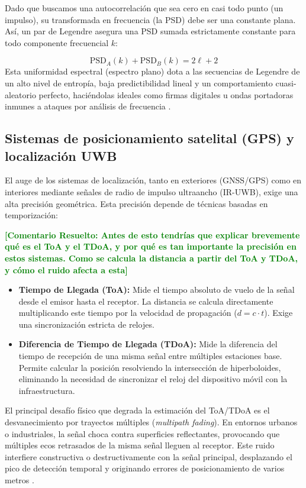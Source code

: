 \documentclass[12pt,a4paper]{tfg_domingo}
\newcommand{\ComentarioR}[1]{\textcolor{green}{\textbf{[Comentario Resuelto:
#1]}}}
\begin{document}
Dado que buscamos una autocorrelación que sea cero en casi todo punto (un impulso), su transformada en frecuencia (la PSD) debe ser una constante plana. Así, un par de Legendre asegura una PSD sumada estrictamente constante para todo componente frecuencial $k$:

$$ \text{PSD}_A(k) + \text{PSD}_B(k) = 2\ell + 2 $$
Esta uniformidad espectral (espectro plano) dota a las secuencias de Legendre de un alto nivel de entropía, baja predictibilidad lineal y un comportamiento cuasi-aleatorio perfecto, haciéndolas ideales como firmas digitales u ondas portadoras inmunes a ataques por análisis de frecuencia \cite{damgaard1988randomness}.

\subsection{Sistemas de posicionamiento satelital (GPS) y localización UWB}
El auge de los sistemas de localización, tanto en exteriores (GNSS/GPS) como en interiores mediante señales de radio de impulso ultraancho (IR-UWB), exige una alta precisión geométrica. Esta precisión depende de técnicas basadas en temporización:

\ComentarioR{Antes de esto tendrías que explicar brevemente qué es el
  ToA y el TDoA, y por qué es tan importante la precisión en estos
  sistemas. Como se calcula la distancia a partir del ToA y TDoA, y cómo el ruido afecta a esta}
  
\begin{itemize}
    \item \textbf{Tiempo de Llegada (ToA):} Mide el tiempo absoluto de vuelo de la señal desde el emisor hasta el receptor. La distancia se calcula directamente multiplicando este tiempo por la velocidad de propagación ($d = c \cdot t$). Exige una sincronización estricta de relojes.
    \item \textbf{Diferencia de Tiempo de Llegada (TDoA):} Mide la diferencia del tiempo de recepción de una misma señal entre múltiples estaciones base. Permite calcular la posición resolviendo la intersección de hiperboloides, eliminando la necesidad de sincronizar el reloj del dispositivo móvil con la infraestructura.
\end{itemize}

El principal desafío físico que degrada la estimación del ToA/TDoA es el desvanecimiento por trayectos múltiples (\emph{multipath fading}). En entornos urbanos o industriales, la señal choca contra superficies reflectantes, provocando que múltiples ecos retrasados de la misma señal lleguen al receptor. Este ruido interfiere constructiva o destructivamente con la señal principal, desplazando el pico de detección temporal y originando errores de posicionamiento de varios metros \cite{cantabria2021positioning}.
\end{document}
